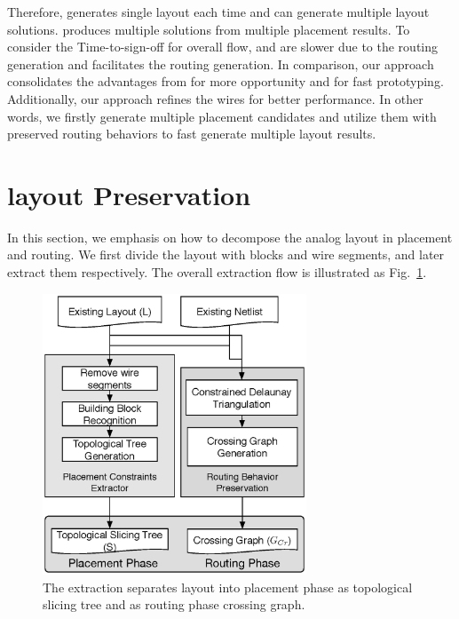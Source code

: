     Therefore, \cite{msc-bhattacharya-tcad06} generates single layout each time and \cite{ALP_YPWeng_iccad2011} can generate multiple layout solutions. \cite{Chin_DMR_ICCAD2013} produces multiple solutions from multiple placement results. To consider the Time-to-sign-off for overall flow, \cite{msc-bhattacharya-tcad06} and \cite{ALP_YPWeng_iccad2011} are slower due to the routing generation and \cite{Chin_DMR_ICCAD2013} facilitates the routing generation. In comparison, our approach consolidates the advantages from \cite{ALP_YPWeng_iccad2011} for more opportunity and \cite{Chin_DMR_ICCAD2013} for fast prototyping. Additionally, our approach refines the wires for better performance. In other words, we firstly generate multiple placement candidates and utilize them with preserved routing behaviors to fast generate multiple layout results. 

  \section{layout Preservation}\label{sec:LayoutPreserv}

    In this section, we emphasis on how to decompose the analog layout in placement and routing. We first divide the layout with blocks and wire segments, and later extract them respectively. The overall extraction flow is illustrated as Fig.~\ref{fig:ExtractFlow}. 

    \begin{figure}[t]
        \begin{center}
          \includegraphics[width=0.7\textwidth]{Fig/Chapter4/ExtractFlow.eps}
          \caption{The extraction separates layout into placement phase as topological slicing tree and as routing phase crossing graph.}
          \label{fig:ExtractFlow}
        \end{center}
    \end{figure}
